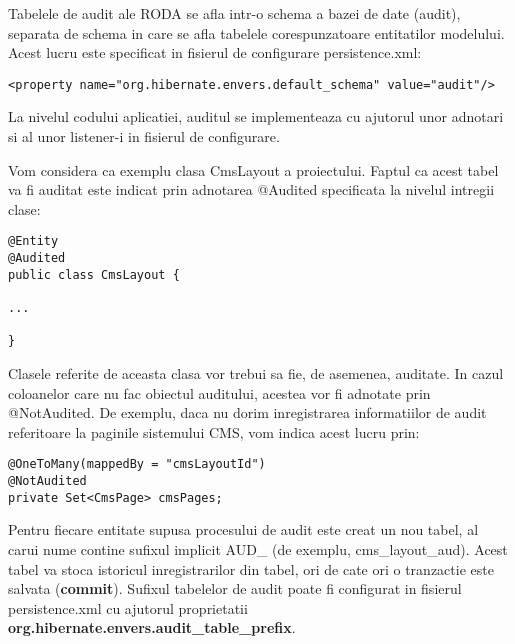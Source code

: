 \bigskip

Tabelele de audit ale RODA se afla intr-o schema a bazei de date (audit), separata de schema in care se afla tabelele corespunzatoare entitatilor modelului. Acest lucru este specificat in fisierul de configurare persistence.xml:


\bigskip

\begin{lstlisting}[breaklines=true]
<property name="org.hibernate.envers.default_schema" value="audit"/>
\end{lstlisting}

\bigskip

La nivelul codului aplicatiei, auditul se implementeaza cu ajutorul unor adnotari si al unor listener-i in fisierul de configurare.

\bigskip

Vom considera ca exemplu clasa CmsLayout a proiectului. 
Faptul ca acest tabel va fi auditat este indicat prin adnotarea @Audited specificata la nivelul intregii clase:

\bigskip

\begin{lstlisting}[breaklines=true]
@Entity
@Audited
public class CmsLayout {

...

}
\end{lstlisting}

\bigskip

Clasele referite de aceasta clasa vor trebui sa fie, de asemenea, auditate. In cazul coloanelor care nu fac obiectul auditului, acestea vor fi adnotate prin @NotAudited. De exemplu, daca nu dorim inregistrarea informatiilor de audit referitoare la paginile sistemului CMS, vom indica acest lucru prin:

\bigskip

\begin{lstlisting}[breaklines=true]
@OneToMany(mappedBy = "cmsLayoutId")
@NotAudited
private Set<CmsPage> cmsPages;
\end{lstlisting}

Pentru fiecare entitate supusa procesului de audit este creat un nou tabel, al carui nume contine sufixul implicit AUD\_ (de exemplu, cms\_layout\_aud). 
Acest tabel va stoca istoricul inregistrarilor din tabel, ori de cate ori o tranzactie este salvata (\textbf{commit}). 
Sufixul tabelelor de audit poate fi configurat in fisierul persistence.xml cu ajutorul proprietatii \textbf{org.hibernate.envers.audit\_table\_prefix}.

